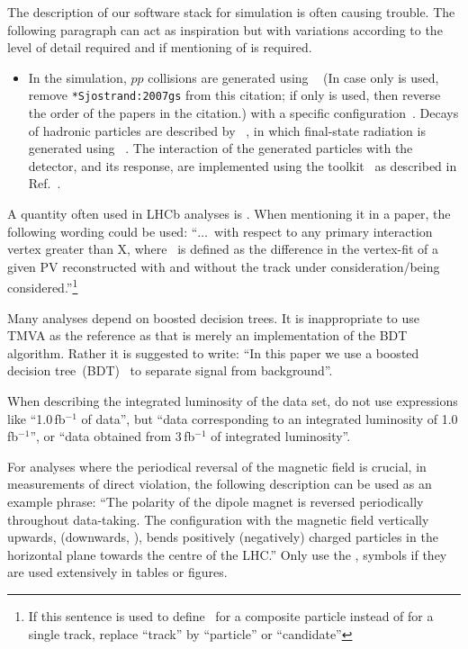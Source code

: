 The description of our software stack for simulation is often
causing trouble. The following paragraph can act as inspiration but
with variations according to the level of detail required and if
mentioning of \eg \photos is required.
\begin{itemize}
\item In the simulation, $pp$ collisions are generated using
\pythia~\cite{Sjostrand:2006za,*Sjostrand:2007gs} 
(In case only  is used, remove \verb=*Sjostrand:2007gs= from this citation; if 
only  is used, then reverse the order of the papers in the citation.)
 with a specific \lhcb
configuration~\cite{LHCb-PROC-2010-056}.  Decays of hadronic particles
are described by \evtgen~\cite{Lange:2001uf}, in which final-state
radiation is generated using \photos~\cite{Golonka:2005pn}. The
interaction of the generated particles with the detector, and its response,
are implemented using the \geant
toolkit~\cite{Allison:2006ve, *Agostinelli:2002hh} as described in
Ref.~\cite{LHCb-PROC-2011-006}.
\end{itemize}

A quantity often used in LHCb analyses is \chisqip. When mentioning it in 
a paper, the following wording could be used: ``$\ldots$\chisqip\ with respect 
to any primary interaction vertex greater than X, where \chisqip\ is defined as 
the difference in the vertex-fit \chisq of a given PV reconstructed with and
without the track under consideration/being considered.''\footnote{If this
sentence is used to define \chisqip\ for a composite particle instead of 
for a single track, replace ``track'' by ``particle'' or ``candidate''}

Many analyses depend on boosted decision trees. It is inappropriate to
use TMVA as the reference as that is merely an implementation of the
BDT algorithm. Rather it is suggested to write: ``In this paper we use a 
boosted decision tree~(BDT)~\cite{Breiman,AdaBoost} to separate signal 
from background''.

When describing the integrated luminosity of the data set, do not use
expressions like ``1.0\,fb$^{-1}$ of data'', but \eg 
``data corresponding to an integrated luminosity of 1.0\,fb$^{-1}$'', 
or ``data obtained from 3\,fb$^{-1}$ of integrated luminosity''. 

For analyses where the periodical reversal of the magnetic field is crucial, 
\eg in measurements of direct \CP violation, the following description can be
used as an example phrase: 
``The polarity of the dipole magnet is reversed periodically throughout data-taking.
The configuration with the magnetic field vertically upwards, \MagUp (downwards, \MagDown), bends positively (negatively)
charged particles in the horizontal plane towards the centre of the LHC.''
Only use the \MagUp, \MagDown symbols if they are used extensively in tables or figures.
